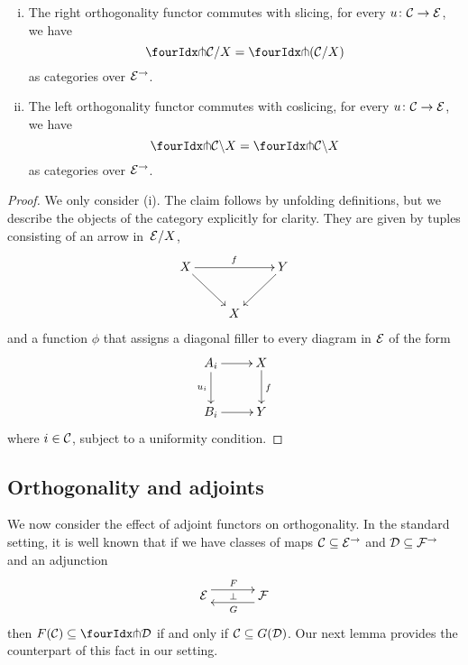 \documentclass[reqno,10pt,a4paper,oneside]{amsart}
\begin{document}
\begin{proposition} \hfill 
\label{pitchfork-slicing}
\begin{enumerate}[(i)]
\item The right orthogonality functor commutes with slicing, \ie for every $u \co \cal{C} \to \cal{E}$, we have
\[
  \liftr{\cal{C}}/X = \liftr{(\cal{C}/X)}
\]
as categories over $\cal{E}^\to$.
\item The left orthogonality functor commutes with coslicing, \ie for every $u \co \cal{C} \to \cal{E}$, we have
\[
 \liftl{\cal{C}} \backslash X = \liftl{\cal{C} \backslash X}
\]
as categories over $\cal{E}^\to$.
\end{enumerate}
\end{proposition}

\begin{proof} We only consider (i). The claim follows by unfolding definitions, but we describe the objects of the category explicitly for clarity. They are given by 
tuples consisting of an arrow in~$\cal{E}/X$, 
\[
\xymatrix{
X \ar[dr] \ar[rr]^f  &  & Y \ar[dl] \\
 & X & }
 \]
and a function $\phi$ that assigns a diagonal filler to every diagram in $\cal{E}$ of the form
\[
\xymatrix{
A_i \ar[r] \ar[d]_{u_i} & X \ar[d]^{f} \\
B_i \ar[r] & Y}
\]
where $i \in \cal{C}$, subject to a uniformity condition. 
\end{proof}





\subsection*{Orthogonality and adjoints}
We now consider the effect of adjoint functors on orthogonality. In the standard setting, it is well known that if 
we have classes of maps $\cal{C} \subseteq \cal{E}^\to$ and $\cal{D} \subseteq \cal{F}^\to$ and an adjunction
\[
\xymatrix@C+1em{
  \cal{E}
  \ar@<5pt>[r]^{F}
  \ar@{}[r]|{\bot}
&
  \cal{F}
  \ar@<5pt>[l]^{G}
}
\]
then $F(\cal{C}) \subseteq \liftl{\cal{D}}$ if and only if $\cal{C} \subseteq G(\cal{D})$. Our next lemma provides the counterpart of this fact in our setting.
\end{document}
